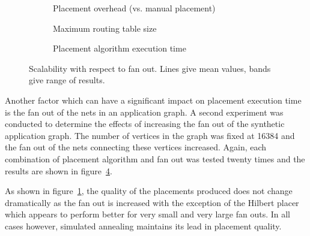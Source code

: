 				\begin{figure}
					\center
					\begin{subfigure}{\linewidth}
						\center
						
						\caption{Placement overhead (vs. manual placement)}
						\label{fig:placement-scalability-fanout-quality}
					\end{subfigure}
					
					\vspace*{1em}
					
					\begin{subfigure}{\linewidth}
						\center
						
						\caption{Maximum routing table size}
						\label{fig:placement-scalability-fanout-entries}
					\end{subfigure}
					
					\vspace*{1em}
					
					\begin{subfigure}{\linewidth}
						\center
						
						\caption{Placement algorithm execution time}
						\label{fig:placement-scalability-fanout-runtime}
					\end{subfigure}
					
						\caption[Placer scalability with respect to fan out.]%
						{Scalability with respect to fan out. Lines give mean values,
						bands give range of results.}
					\label{fig:placement-scalability-fanout}
				\end{figure}
				
				Another factor which can have a significant impact on placement
				execution time is the fan out of the nets in an application graph. A
				second experiment was conducted to determine the effects of increasing
				the fan out of the synthetic application graph. The number of vertices
				in the graph was fixed at \num{16384} and the fan out of the nets
				connecting these vertices increased. Again, each combination of
				placement algorithm and fan out was tested twenty times and the results
				are shown in figure~\ref{fig:placement-scalability-fanout}.
				
				As shown in figure~\ref{fig:placement-scalability-fanout-quality}, the
				quality of the placements produced does not change dramatically as the
				fan out is increased with the exception of the Hilbert placer which
				appears to perform better for very small and very large fan outs. In
				all cases however, simulated annealing maintains its lead in placement
				quality.
				
